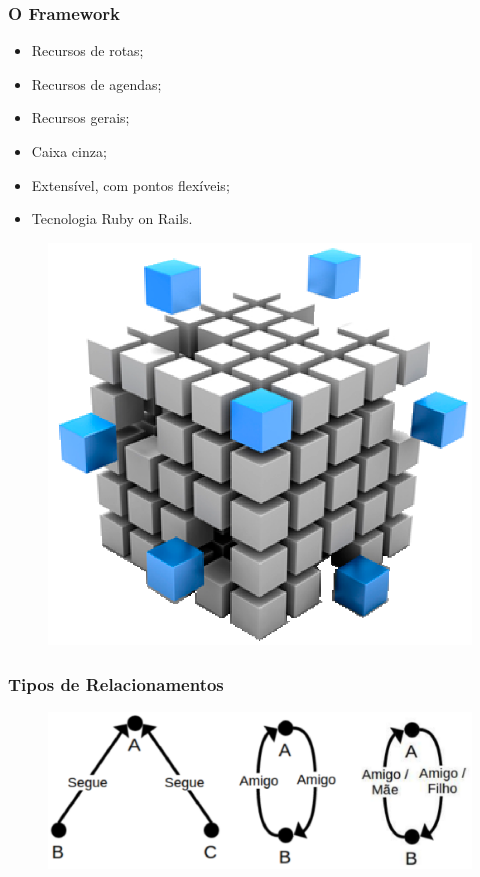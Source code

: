 \documentclass{beamer}
\begin{document}
\begin{frame}
\frametitle{O Framework}

\begin{itemize}
	\item Recursos de rotas;
	\item Recursos de agendas;
	\item Recursos gerais;
	\item Caixa cinza;
	\item Extensível, com pontos flexíveis;
	\item Tecnologia Ruby on Rails.
\end{itemize}

\begin{figure}[h]
	\centering
	\includegraphics[scale=0.35]{figuras/framework.eps}
\end{figure}

\end{frame}

\begin{frame}
\frametitle{Tipos de Relacionamentos}

\begin{figure}[h]
	\centering
	\includegraphics[scale=0.6]{figuras/relacionamentos.eps}
\end{figure}

\end{frame}
\end{document}
